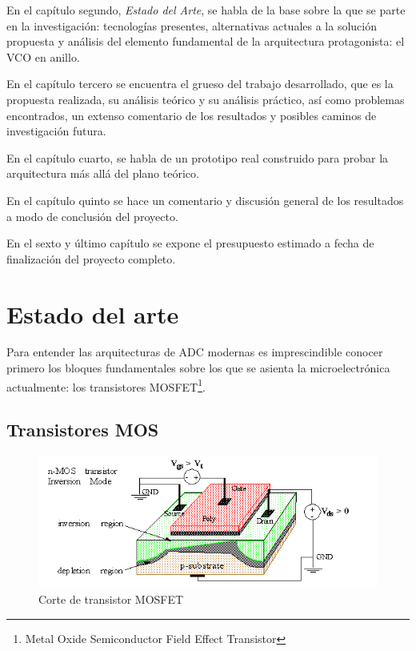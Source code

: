 \documentclass[12pt]{report} %
\begin{document}
	En el capítulo segundo, \textit{Estado del Arte}, se habla de la base sobre la que se parte en la investigación: tecnologías presentes, alternativas actuales a la solución propuesta y análisis del elemento fundamental de la arquitectura protagonista: el VCO en anillo.
	
	En el capítulo tercero se encuentra el grueso del trabajo desarrollado, que es la propuesta realizada, su análisis teórico y su análisis práctico, así como problemas encontrados, un extenso comentario de los resultados y posibles caminos de investigación futura.
	
	En el capítulo cuarto, se habla de un prototipo real construido para probar la arquitectura más allá del plano teórico.
	
	En el capítulo quinto se hace un comentario y discusión general de los resultados a modo de conclusión del proyecto.
	
	En el sexto y último capítulo se expone el presupuesto estimado a fecha de finalización del proyecto completo.
		

\chapter{Estado del arte}

	Para entender las arquitecturas de ADC modernas es imprescindible conocer primero los bloques fundamentales sobre los que se asienta la microelectrónica actualmente: los transistores MOSFET\footnote{Metal Oxide Semiconductor Field Effect Transistor}.
	
	\section{Transistores MOS}
	
	\begin{figure}[H]
		\includegraphics[width=\textwidth]{mos_transistor.png}
		\caption[Corte de transistor MOSFET]{Corte de transistor MOSFET\protect\footnotemark}
		\label{fig:mos_transistor.png}
	\end{figure}
\end{document}
